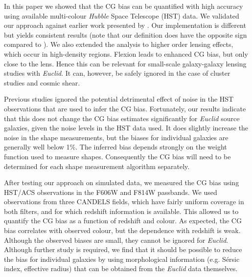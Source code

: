 \documentclass[useAMS,usenatbib]{mnras}
\begin{document}
In this paper we showed that the CG bias can be quantified with high accuracy using available multi-colour {\it Hubble} Space Telescope (HST) data. We validated our approach against earlier work presented by
. Our implementation is different but yields consistent results (note that our definition does have the opposite sign compared to ). We also extended the analysis to higher order lensing effects, which occur in high-density regions. Flexion leads to enhanced CG bias, but only close to the lens. Hence this can be relevant for small-scale galaxy-galaxy lensing studies with {\it Euclid}. It can, however, be safely ignored in the case of cluster studies and cosmic shear.

Previous studies ignored the potential detrimental effect of noise in the HST observations that are used to infer the CG bias. Fortunately, our results indicate that this does not change the CG bias estimates significantly for {\it Euclid} source galaxies, given the noise levels in the HST data used. It does slightly increase the noise in the shape measurements, but the biases for individual galaxies are generally well below 1\%.
The inferred bias depends strongly on the weight function used to measure shapes. Consequently the CG bias will need to be determined for each shape measurement algorithm separately.

After testing our approach on simulated data, we measured the CG bias using HST/ACS observations
in the F606W and F814W passbands. We used observations from three CANDELS fields, which have
fairly uniform coverage in both filters, and for which redshift information is available. This allowed us to quantify the CG bias as a function of redshift and colour. As expected, the CG bias correlates with observed colour, but the dependence with redshift is weak. Although the observed biases are small, they cannot be ignored for {\it Euclid}. Although further study is required, we find that it should be possible to reduce the bias for individual galaxies by using morphological information (e.g. S{\'e}rsic index, effective radius) that can be obtained from the {\it Euclid} data themselves.
\end{document}
